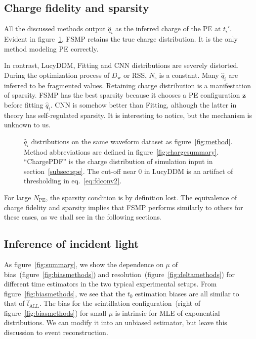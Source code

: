 \subsection{Charge fidelity and sparsity}

All the discussed methods output $\hat{q}_i$ as the inferred charge of the PE at $t_i'$.  Evident in figure~\ref{fig:recchargehist}, FSMP retains the true charge distribution.  It is the only method modeling PE correctly.

In contrast, LucyDDM, Fitting and CNN distributions are severely distorted.  During the optimization process of $D_\mathrm{w}$ or RSS, $N_\mathrm{s}$ is a constant. Many $\hat{q}_i$ are inferred to be fragmented values.  Retaining charge distribution is a manifestation of sparsity.  FSMP has the best sparsity because it chooses a PE configuration $\bm{z}$ before fitting $\hat{q}_i$.  CNN is somehow better than Fitting, although the latter in theory has self-regulated sparsity.  It is interesting to notice, but the mechanism is unknown to us.

\begin{figure}[H]
  \centering
  \resizebox{0.6\textwidth}{!}{}
  \caption{\label{fig:recchargehist} $\hat{q}_i$ distributions on the same waveform dataset as figure~\ref{fig:method}.  Method abbreviations are defined in figure~\ref{fig:chargesummary}. ``ChargePDF'' is the charge distribution of simulation input in section~\ref{subsec:spe}. The cut-off near 0 in LucyDDM is an artifact of thresholding in eq.~\eqref{eq:fdconv2}.}
\end{figure}

For large $N_\mathrm{PE}$, the sparsity condition is by definition lost.  The equivalence of charge fidelity and sparsity implies that FSMP performs similarly to others for these cases, as we shall see in the following sections.

\subsection{Inference of incident light}
\label{subsec:timeresolution}

As figure~\ref{fig:summary}, we show the dependence on $\mu$ of bias~(figure~\ref{fig:biasmethods}) and resolution~(figure~\ref{fig:deltamethods}) for different time estimators in the two typical experimental setups.  From figure~\ref{fig:biasmethods}, we see that the $t_0$ estimation biases are all similar to that of $\hat{t}_\mathrm{ALL}$. The bias for the scintillation configuration~(right of figure~\ref{fig:biasmethods}) for small $\mu$ is intrinsic for MLE of exponential distributions.  We can modify it into an unbiased estimator, but leave this discussion to event reconstruction.

